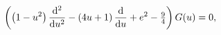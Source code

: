 \begin{equation}
\label{OD1f0}
\left(\left(1-u^2\right)\frac{{\rm d}^2}{{\rm d} u^2} - 
\left(4 u+1 \right) \frac{{\rm
d}}{{\rm d}u} + e^2 - \tfrac{9}{4}
\right) G(u) = 0,
\end{equation}

